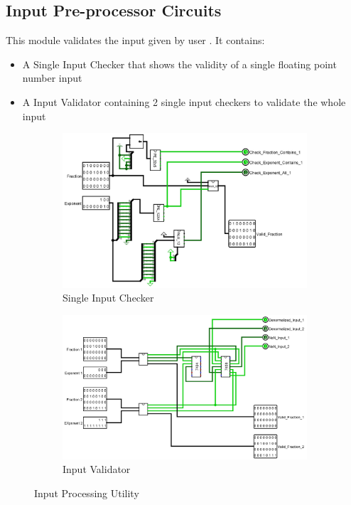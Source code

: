 \documentclass[12pt]{article}
\begin{document}
\subsection{Input Pre-processor Circuits}
This module validates the input given by user . It contains:
\begin{itemize}
    \item A Single Input Checker that shows the validity of a single floating point number input
    \item A Input Validator containing 2 single input checkers to validate the whole input
\end{itemize}
\begin{figure}[H]
\centering
  \begin{subfigure}[b]{\textwidth}
  \includegraphics[width=\textwidth]{images/Single_Input_Checker.jpg}
  \caption{Single Input Checker}
  \label{fig:inpcheck}
  \end{subfigure}
  
 \begin{subfigure}[b]{\textwidth}
  \includegraphics[width=\textwidth]{images/Input_Validator.jpg}
  \caption{Input Validator}
  \label{fig:inpval}
  \end{subfigure}
 \caption{Input Processing Utility}\label{fig:inpproc}
\end{figure}
\newpage
\end{document}
